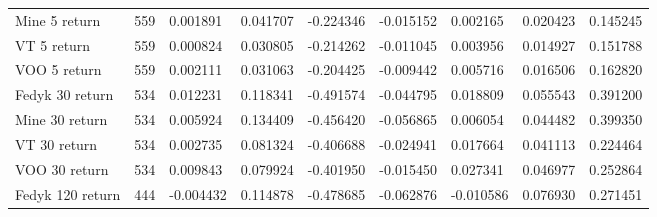 \begin{appendices}
\begin{table}[ht]
\begin{adjustbox}{width=\textwidth}
\begin{tabular}{@{}lllllllll@{}}
    Mine 5 return                 & 559                                & 0.001891                          & 0.041707                         & -0.224346                        & -0.015152                         & 0.002165                          & 0.020423                          & 0.145245                         \\
    VT 5 return               & 559                               & 0.000824                           & 0.030805                         & -0.214262                        & -0.011045                         & 0.003956                          & 0.014927                          & 0.151788                         \\
    VOO 5 return              & 559                               & 0.002111                           & 0.031063                         & -0.204425                        & -0.009442                         & 0.005716                          & 0.016506                          & 0.162820                         \\
    Fedyk 30 return               & 534                                & 0.012231                          & 0.118341                         & -0.491574                        & -0.044795                         & 0.018809                          & 0.055543                          & 0.391200                         \\
    Mine 30 return                & 534                                & 0.005924                          & 0.134409                         & -0.456420                        & -0.056865                         & 0.006054                          & 0.044482                          & 0.399350                         \\
    VT 30 return              & 534                               & 0.002735                           & 0.081324                         & -0.406688                        & -0.024941                         & 0.017664                          & 0.041113                          & 0.224464                         \\
    VOO 30 return             & 534                               & 0.009843                           & 0.079924                         & -0.401950                        & -0.015450                         & 0.027341                          & 0.046977                          & 0.252864                         \\
    Fedyk 120 return              & 444                                & -0.004432                         & 0.114878                         & -0.478685                        & -0.062876                         & -0.010586                         & 0.076930                          & 0.271451                         \\

\end{tabular}
\end{adjustbox}
\end{table}
\end{appendices}
